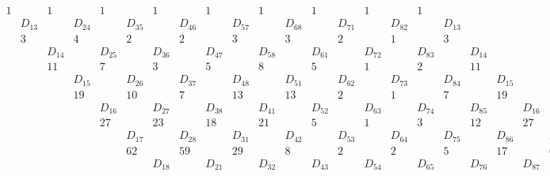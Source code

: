 \documentclass[a4paper]{amsart}
\begin{document}
\begin{figure}
\begin{center}
\setlength{\arraycolsep}{0mm}
$$
\begin{array}{cccccccccccccccccccccccc}
1 && 1 && 1 && 1 && 1 && 1 && 1 && 1 && 1 &&&& \\
&D_{13}&      &D_{24}&      &D_{35}&      &D_{46}  &      &D_{57}  &      &D_{68}  &      &D_{71}  &      &D_{82}  &      &D_{13}  &      &        &      &        &      & \\
&3     &      &4     &      &2     &      &2       &      &3       &      &3       &      &2       &      &1       &      &3       &      &        &      &        &      & \\
&      &D_{14}&      &D_{25}&      &D_{36}&        &D_{47}&        &D_{58}&        &D_{61}&        &D_{72}&        &D_{83}&        &D_{14}&        &      &        &      & \\
&      &11    &      &7     &      &3     &        &5     &        &8     &        &5     &        &1     &        &2     &        &11    &        &      &        &      & \\
&      &      &D_{15}&      &D_{26}&      &D_{37}  &      &D_{48}  &      &D_{51}  &      &D_{62}  &      &D_{73}  &      &D_{84}  &      &D_{15}  &      &        &      & \\
&      &      &19    &      &10    &      &7       &      &13      &      &13      &      &2       &      &1       &      &7       &      &19      &      &        &      & \\
&      &      &      &D_{16}&      &D_{27}&        &D_{38}&        &D_{41}&        &D_{52}&        &D_{63}&        &D_{74}&        &D_{85}&        &D_{16}&        &      & \\
&      &      &      &27    &      &23    &        &18    &        &21    &        &5     &        &1     &        &3     &        &12    &        &27    &        &      & \\
&      &      &      &      &D_{17}&      &D_{28}  &      &D_{31}  &      &D_{42}  &      &D_{53}  &      &D_{64}  &      &D_{75}  &      &D_{86}  &      &D_{17}  &      & \\
&      &      &      &      &62    &      &59      &      &29      &      &8       &      &2       &      &2       &      &5       &      &17      &      &62      &      & \\
&      &      &      &      &      &D_{18}&        &D_{21}&        &D_{32}&        &D_{43}&        &D_{54}&        &D_{65}&        &D_{76}&        &D_{87}&        &D_{18}& \\

\end{array}$$
\end{center}
\end{figure}
\end{document}
